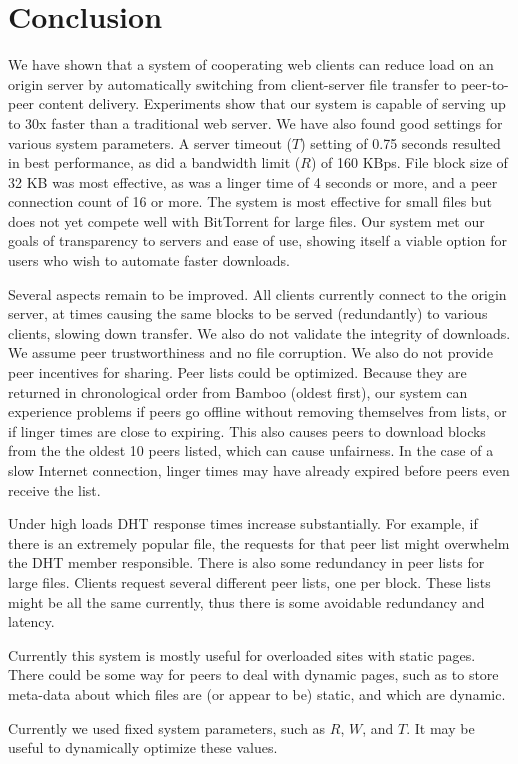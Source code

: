 \chapter{Conclusion}

We have shown that a system of cooperating web clients can reduce load on an origin server by automatically switching
from client-server file transfer to peer-to-peer content delivery. 
Experiments show that our system is capable of serving up to 30x faster than a traditional web server.
We have also found good settings for various system parameters.
A server timeout ($T$) setting of 0.75 seconds resulted in best performance, as did a bandwidth limit ($R$) of 160 KBps.
File block size of 32 KB was most effective, as was a linger time of 4 seconds or more, and a peer connection count of 16 or more.
The system is most effective for small files but does not yet compete well with
BitTorrent for large files.  %
Our system met our goals of transparency to servers and ease of use, showing itself a viable option for users who wish to automate faster downloads.


Several aspects remain to be improved.  All clients currently connect to the origin
server, at times causing the same blocks to be served (redundantly) to various clients, slowing down transfer.
We also do not validate the integrity of downloads.  We assume peer trustworthiness and no file corruption.  We also do not provide peer incentives for sharing.
Peer lists could be optimized.  Because they are returned in chronological order from Bamboo (oldest first), our system can experience problems if peers
go offline without removing themselves from lists, or if linger times are close to expiring.  This also causes peers to download blocks 
from the the oldest 10 peers listed, which can cause unfairness. In the case of a slow Internet connection, linger times may have
already expired before peers even receive the list.

Under high loads DHT response times increase substantially.  For example, if there is an extremely popular file, the 
requests for that peer list might overwhelm the DHT member responsible.  There is also some redundancy in peer lists for large files.  
Clients request several different peer lists, one per block.  These lists might be all the same currently, thus
there is some avoidable redundancy and latency.

Currently this system is mostly useful for overloaded sites with static pages.  There could be some way for peers to deal with dynamic pages, such as to
store meta-data about which files are (or appear to be) static, and which are dynamic.  

Currently we used fixed system parameters, such as $R$, $W$, and $T$.  It may be useful to dynamically optimize these values.